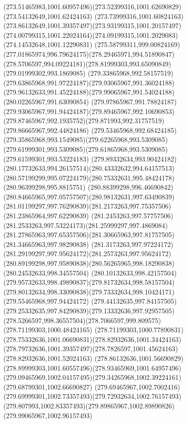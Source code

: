 {{\curveto(273.51465983,1001.60957496)(273.52399316,1001.62690829)(273.54132649,1001.62424163)
\curveto(273.73999316,1001.60824163)(273.86132649,1001.39357497)(273.93199315,1001.20157497)
\curveto(274.00799315,1001.22024164)(274.09199315,1001.2029083)(274.14532648,1001.12290831)
\curveto(275.58799311,999.00824169)(277.01865974,996.79624175)(278.29465971,994.51890847)
\curveto(278.5706597,994.09224181)(278.81999303,993.65090849)(279.01999302,993.1869085)
\curveto(279.33865968,992.58157519)(279.63865968,991.97224187)(279.93065967,991.36024188)
\curveto(279.96132633,991.45224188)(279.99065967,991.54024188)(280.02265967,991.63090854)
\curveto(279.97865967,991.78824187)(279.93065967,991.94424187)(279.89465967,992.10690853)
\curveto(279.87465967,992.1935752)(279.871993,992.31757519)(279.86665967,992.44824186)
\curveto(279.53465968,992.68424185)(279.35865968,993.1549085)(279.62265968,993.5309085)
\curveto(279.61999301,993.5309085)(279.61865968,993.5309085)(279.61599301,993.53224183)
\curveto(279.89332634,993.90424182)(280.17732633,994.26157514)(280.43332632,994.64157513)
\curveto(280.57199299,995.07224179)(280.75332631,995.48424178)(280.96399298,995.8815751)
\curveto(280.88399298,996.46690842)(280.84665965,997.05757507)(280.98132631,997.63490839)
\curveto(281.01199297,997.76290839)(281.2173263,997.75357506)(281.23865964,997.62290839)
\curveto(281.2453263,997.57757506)(281.2533263,997.53224173)(281.25999297,997.4869084)
\curveto(281.27865963,997.65357506)(281.30665963,997.81757505)(281.34665963,997.98290838)
\curveto(281.3173263,997.97224172)(281.29199297,997.95624172)(281.2573263,997.95624172)
\curveto(280.89199298,997.95890838)(280.56265965,998.18290838)(280.24532633,998.34557504)
\curveto(280.10132633,998.42157504)(279.95732633,998.49890837)(279.81732634,998.58157504)
\curveto(279.80132634,998.33090838)(279.73332634,998.10424171)(279.55465968,997.94424172)
\curveto(279.44132635,997.84157505)(279.25332635,997.84290839)(279.13332636,997.92957505)
\curveto(278.5266597,998.36557504)(278.7066597,999.809575)(278.71199303,1000.48424165)
\curveto(278.71199303,1000.77890831)(278.75332636,1001.06690831)(278.82932636,1001.34424163)
\curveto(278.79732636,1001.39357497)(278.7826597,1001.45624163)(278.82932636,1001.52024163)
\curveto(278.86132636,1001.56690829)(278.89999303,1001.60557496)(278.93465969,1001.64957496)
\curveto(279.09465969,1002.04157495)(279.34265968,1002.39224161)(279.68799301,1002.66690827)
\curveto(279.69465967,1002.7002416)(279.69999301,1002.73357493)(279.72932634,1002.76157493)
\curveto(279.807993,1002.83357493)(279.89865967,1002.89890826)(279.99065967,1002.96157493)
}}
